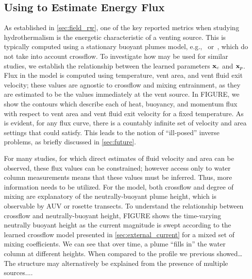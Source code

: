 \subsection{Using \PHUMES to Estimate Energy Flux}
As established in \cref{sec:field_rw}, one of the key reported metrics when studying hydrothermalism is the energetic characteristic of a venting source. This is typically computed using a stationary buoyant plumes model, e.g.,~\cite{morton1956turbulent} or~\cite{speer1989model}, which do not take into account crossflow. To investigate how \PHUMES may be used for similar studies, we establish the relationship between the learned parameters $\mathbf{x}_c$ and $\mathbf{x}_p$. Flux in the model is computed using temperature, vent area, and vent fluid exit velocity; these values are agnostic to crossflow and mixing entrainment, as they are estimated to be the values immediately at the vent source. In FIGURE, we show the contours which describe each of heat, buoyancy, and momentum flux with respect to vent area and vent fluid exit velocity for a fixed temperature. As is evident, for any flux curve, there is a countably infinite set of velocity and area settings that could satisfy. This leads to the notion of ``ill-posed'' inverse problems, as briefly discussed in \cref{sec:future}.


For many studies, for which direct estimates of fluid velocity and area can be observed, these flux values can be constrained; however access only to water column measurements means that these values must be inferred. Thus, more information needs to be utilized. For the \PHUMES model, both crossflow and degree of mixing are explanatory of the neutrally-buoyant plume height, which is observable by AUV or rosette transects. To understand the relationship between crossflow and neutrally-buoyant height, FIGURE shows the time-varying neutrally buoyant height as the current magnitude is swept according to the learned crossflow model presented in \cref{sec:external_current} for a mixed set of mixing coefficients. We can see that over time, a plume ``fills in'' the water column at different heights. When compared to the profile we previous showed\dots The structure may alternatively be explained from the presence of multiple sources....



